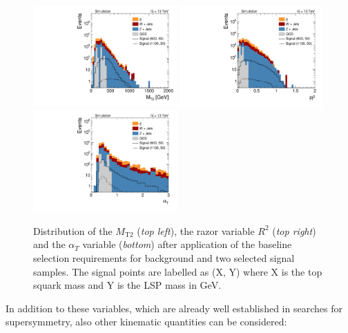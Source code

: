 \begin{figure}[!t]
  \centering
  \begin{minipage}[c]{1.\textwidth}
    \begin{center}
      \includegraphics[width=0.49\textwidth]{figures/Stop_DeltaPhiSelection_MT2.pdf} 
      \includegraphics[width=0.49\textwidth]{figures/Stop_DeltaPhiSelection_Razor_R.pdf} \\
      \includegraphics[width=0.49\textwidth]{figures/Stop_DeltaPhiSelection_AlphaT.pdf}  
    \end{center}
  \end{minipage}

  \caption{Distribution of the $M_\mathrm{T2}$ (\textit{top left}), the razor variable $R^2$ (\textit{top right}) and the $\alpha_T$ variable (\textit{bottom}) after application of the baseline selection requirements for background and two selected signal samples. The signal points are labelled as (X, Y) where X is the top squark mass and Y is the LSP mass in GeV.}
  \label{fig:stop_baseline_kin_vars}
\end{figure}
In addition to these variables, which are already well established in searches for supersymmetry, also other kinematic quantities can be considered:
